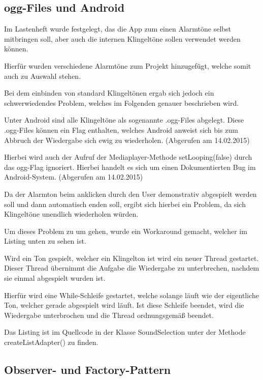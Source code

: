 
\cite{PlacesExample}

\subsection{ogg-Files und Android}
Im Lastenheft wurde festgelegt, das die App zum einen Alarmt\"one selbst mitbringen soll, aber auch die internen Klingelt\"one sollen verwendet werden k\"onnen.

Hierf\"ur wurden verschiedene Alarmt\"one zum Projekt hinzugef\"ugt, welche somit auch zu Auswahl stehen.

Bei dem einbinden von standard Klingelt\"onen ergab sich jedoch ein schwerwiedendes Problem, welches im Folgenden genauer beschrieben wird.

Unter Android sind alle Klingelt\"one als sogenannte .ogg-Files abgelegt. Diese .ogg-Files k\"onnen ein Flag enthalten, welches Android anweist sich bis zum Abbruch der Wiedergabe sich ewig zu wiederholen. 
\cite{oogStackOver} (Abgerufen am 14.02.2015)

Hierbei wird auch der Aufruf der Mediaplayer-Methode setLooping(false) durch das ogg-Flag ignoriert. Hierbei handelt es sich um einen Dokumentierten Bug im Android-System.
\cite{oggBug} (Abgerufen am 14.02.2015)

Da der Alarmton beim anklicken durch den User demonstrativ abgespielt werden soll und dann automatisch enden soll, ergibt sich hierbei ein Problem, da sich Klingelt\"one unendlich wiederholen w\"urden.

Um dieses Problem zu um gehen, wurde ein Workaround gemacht, welcher im Listing unten zu sehen ist.

Wird ein Ton gespielt, welcher ein Klingelton ist wird ein neuer Thread gestartet. Dieser Thread \"ubernimmt die Aufgabe die Wiedergabe zu unterbrechen, nachdem sie einmal abgespielt wurden ist.

Hierf\"ur wird eine While-Schleife gestartet, welche solange l\"auft wie der eigentliche Ton, welcher gerade abgespielt wird l\"auft. Ist diese Schleife beendet, wird die Wiedergabe unterbrochen und die Thread ordnungsgem\"a\ss{} beendet.

Das Listing ist im Quellcode in der Klasse SoundSelection unter der Methode createListAdapter() zu finden.



\subsection{Observer- und Factory-Pattern}